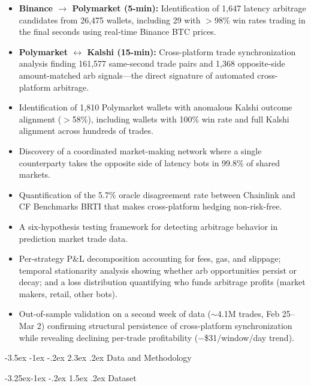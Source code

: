 \documentclass[11pt,a4paper]{article}
\makeatletter
\renewcommand\section{\@startsection{section}{1}{\z@}%
  {-3.5ex \@plus -1ex \@minus -.2ex}%
  {2.3ex \@plus .2ex}%
  {\normalfont\Large\bfseries}}
\renewcommand\subsection{\@startsection{subsection}{2}{\z@}%
  {-3.25ex\@plus -1ex \@minus -.2ex}%
  {1.5ex \@plus .2ex}%
  {\normalfont\large\bfseries}}
\makeatother
\begin{document}
\begin{itemize}[nosep]
    \item \textbf{Binance $\to$ Polymarket (5-min):} Identification of 1,647 latency arbitrage candidates from 26,475 wallets, including 29 with $>$98\% win rates trading in the final seconds using real-time Binance BTC prices.
    \item \textbf{Polymarket $\leftrightarrow$ Kalshi (15-min):} Cross-platform trade synchronization analysis finding 161,577 same-second trade pairs and 1,368 opposite-side amount-matched arb signals---the direct signature of automated cross-platform arbitrage.
    \item Identification of 1,810 Polymarket wallets with anomalous Kalshi outcome alignment ($>$58\%), including wallets with 100\% win rate and full Kalshi alignment across hundreds of trades.
    \item Discovery of a coordinated market-making network where a single counterparty takes the opposite side of latency bots in 99.8\% of shared markets.
    \item Quantification of the 5.7\% oracle disagreement rate between Chainlink and CF Benchmarks BRTI that makes cross-platform hedging non-risk-free.
    \item A six-hypothesis testing framework for detecting arbitrage behavior in prediction market trade data.
    \item Per-strategy P\&L decomposition accounting for fees, gas, and slippage; temporal stationarity analysis showing whether arb opportunities persist or decay; and a loss distribution quantifying who funds arbitrage profits (market makers, retail, other bots).
    \item Out-of-sample validation on a second week of data ($\sim$4.1M trades, Feb 25--Mar 2) confirming structural persistence of cross-platform synchronization while revealing declining per-trade profitability ($-$\$31/window/day trend).
\end{itemize}

\newpage
\section{Data and Methodology}

\subsection{Dataset}
\end{document}

